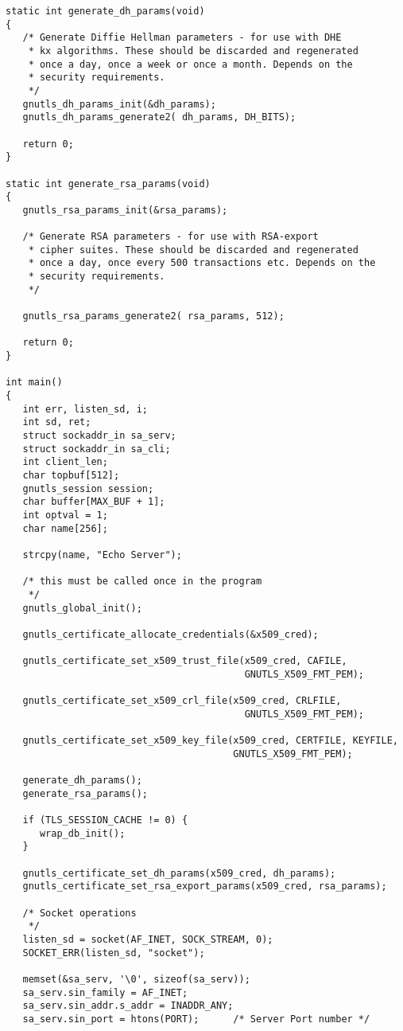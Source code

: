 \begin{verbatim}
static int generate_dh_params(void)
{
   /* Generate Diffie Hellman parameters - for use with DHE
    * kx algorithms. These should be discarded and regenerated
    * once a day, once a week or once a month. Depends on the
    * security requirements.
    */
   gnutls_dh_params_init(&dh_params);
   gnutls_dh_params_generate2( dh_params, DH_BITS);

   return 0;
}

static int generate_rsa_params(void)
{
   gnutls_rsa_params_init(&rsa_params);

   /* Generate RSA parameters - for use with RSA-export
    * cipher suites. These should be discarded and regenerated
    * once a day, once every 500 transactions etc. Depends on the
    * security requirements.
    */

   gnutls_rsa_params_generate2( rsa_params, 512);

   return 0;
}

int main()
{
   int err, listen_sd, i;
   int sd, ret;
   struct sockaddr_in sa_serv;
   struct sockaddr_in sa_cli;
   int client_len;
   char topbuf[512];
   gnutls_session session;
   char buffer[MAX_BUF + 1];
   int optval = 1;
   char name[256];

   strcpy(name, "Echo Server");

   /* this must be called once in the program
    */
   gnutls_global_init();

   gnutls_certificate_allocate_credentials(&x509_cred);

   gnutls_certificate_set_x509_trust_file(x509_cred, CAFILE,
                                          GNUTLS_X509_FMT_PEM);

   gnutls_certificate_set_x509_crl_file(x509_cred, CRLFILE,
                                          GNUTLS_X509_FMT_PEM);

   gnutls_certificate_set_x509_key_file(x509_cred, CERTFILE, KEYFILE,
                                        GNUTLS_X509_FMT_PEM);

   generate_dh_params();
   generate_rsa_params();

   if (TLS_SESSION_CACHE != 0) {
      wrap_db_init();
   }

   gnutls_certificate_set_dh_params(x509_cred, dh_params);
   gnutls_certificate_set_rsa_export_params(x509_cred, rsa_params);

   /* Socket operations
    */
   listen_sd = socket(AF_INET, SOCK_STREAM, 0);
   SOCKET_ERR(listen_sd, "socket");

   memset(&sa_serv, '\0', sizeof(sa_serv));
   sa_serv.sin_family = AF_INET;
   sa_serv.sin_addr.s_addr = INADDR_ANY;
   sa_serv.sin_port = htons(PORT);      /* Server Port number */


\end{verbatim}
